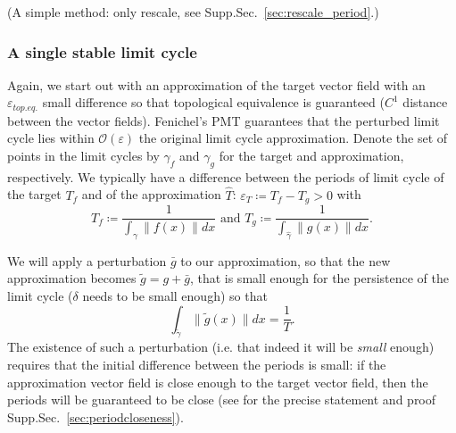 \documentclass{article}
\newcommand{\ascomment}[1]{\textcolor{ascolor}{(#1)}}
\theoremstyle{definition} \newtheorem{definition}{Definition}
\theoremstyle{remark} \newtheorem{remark}{Remark}
\newcounter{ct}
\begin{document}
\ascomment{A simple method: only rescale, see Supp.Sec.~\ref{sec:rescale_period}.}

\subsubsection{A single stable limit cycle}
Again, we start out with an approximation of the target vector field with an $\varepsilon_{top.eq.}$ small difference so that topological equivalence is guaranteed ($C^1$ distance between the vector fields).
Fenichel's PMT guarantees that the perturbed limit cycle lies within $\mathcal{O}(\varepsilon)$ the original limit cycle approximation. %
Denote the set of points in the limit cycles by $\gamma_f$ and $\gamma_g$ for the target and approximation, respectively.
%
We typically have a difference between the periods of limit cycle of the target $T_f$ and of the approximation $\hat T$: $\varepsilon_T\coloneqq T_f- T_g>0$
with \[T_f\coloneqq\frac{1}{\int_{\gamma}\|f(x)\|dx} \text{ and } T_g\coloneqq\frac{1}{\int_{\hat{\gamma}}\|g(x)\|dx}.\]

We will apply a perturbation $\bar{g}$ to our approximation, so that the new approximation becomes $\tilde g = g + \bar g$, that is small enough for the persistence of the limit cycle ($\delta$ needs to be small enough) 
so that 
\begin{equation}\label{eq:lc_constraint}
\int_{\tilde{\gamma}}\|\tilde{g}(x)\| dx = \frac{1}{T}. 	%
\end{equation}
The existence of such a perturbation (i.e. that indeed it will be \emph{small} enough) requires that the initial difference between the periods is small:
if the approximation vector field is close enough to the target vector field, then the periods will be guaranteed to be close (see for the precise statement and proof Supp.Sec.~\ref{sec:periodcloseness}).
\end{document}
